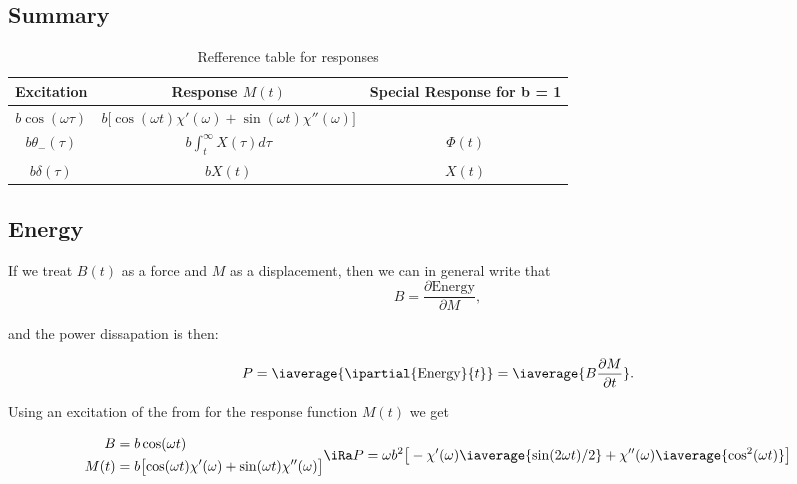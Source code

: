   \subsection{Summary}
  \begin{table}[h]
    \centering
    \caption{Refference table for responses\label{tab:responses}}
    \begin{tabular}{|c|c|c|}
      \hline\textbf{Excitation} & \textbf{Response} $ M(t) $ & \textbf{Special Response for b = 1}\\\hline
      $ b\cos(\omega \tau) $ & $ b\big[{\cos(\omega t)\chi'(\omega)} + {\sin(\omega t)\chi''(\omega)}\big] $ & \\
      $ b\theta_-(\tau) $ & $ b\int_{t}^{\infty}X(\tau)d\tau $ & $ \Phi(t) $\\
      $ b\delta(\tau) $ & $ bX(t) $ & $ X(t) $\\\hline
    \end{tabular}
  \end{table}


\subsection{Energy}
If we  treat $ B(t)  $ as a  force and $ M  $ as a  displacement, then we  can in
general write that
\begin{equation}\label{eqn:energy_1}
  B = \frac{\partial\text{Energy}}{\partial M},
\end{equation}

\noindent and the power dissapation is then:

 \begin{equation}
   P = \iaverage{\ipartial{\text{Energy}}{t}} = \iaverage{B\frac{\partial M}{\partial t}}.
 \end{equation}

 \noindent Using an excitation of the from  for the response function $ M(t) $ we
 get

 \begin{equation}
   \begin{aligned}
     B & = b\cos(\omega t)\\
     M(t)    &    =    b\big[{\cos(\omega   t)\chi'(\omega)}    +    {\sin(\omega
       t)\chi''(\omega)}\big]
   \end{aligned}
   \iRa P = \omega b^2\big[-\chi'(\omega)\iaverage{\sin(2\omega t)/2} + \chi''(\omega)\iaverage{\cos^2(\omega t)}\big]
 \end{equation}

